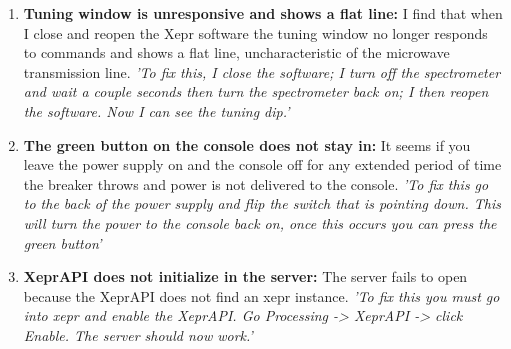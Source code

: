 \documentclass{article}
\newcommand{\fc}[1]{{\color{blue}\textit{'{#1}'}}}
\begin{document}
\begin{enumerate}
\item {\bf Tuning window is unresponsive and shows a flat line:} I find that when I close and reopen the Xepr software the tuning window no longer responds to commands and shows a flat line, uncharacteristic of the microwave transmission line. \fc{To fix this, I close the software; I turn off the spectrometer and wait a couple seconds then turn the spectrometer back on; I then reopen the software. Now I can see the tuning dip.}

\item {\bf The green button on the console does not stay in:} It seems if you leave the power supply on and the console off for any extended period of time the breaker throws and power is not delivered to the console. \fc{To fix this go to the back of the power supply and flip the switch that is pointing down. This will turn the power to the console back on, once this occurs you can press the green button}

\item {\bf XeprAPI does not initialize in the server:} The server fails to open because the XeprAPI does not find an xepr instance. \fc{To fix this you must go into xepr and enable the XeprAPI. Go Processing -> XeprAPI -> click Enable. The server should now work.}

\end{enumerate}
\end{document}
